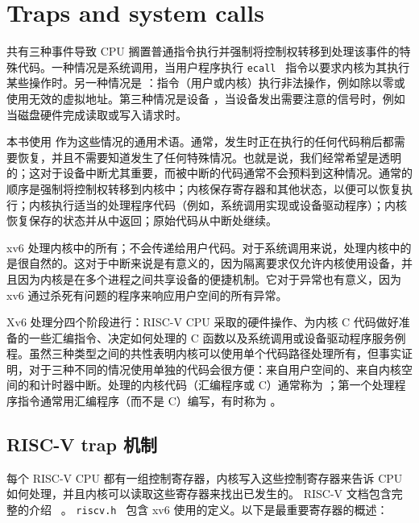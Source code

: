 

   \chapter{Traps and system calls}   
    \label{CH:TRAP}     

共有三种事件导致 CPU 搁置普通指令执行并强制将控制权转移到处理该事件的特殊代码。一种情况是系统调用，当用户程序执行  {    \tt    ecall   }  指令以要求内核为其执行某些操作时。另一种情况是        ：指令（用户或内核）执行非法操作，例如除以零或使用无效的虚拟地址。第三种情况是设备        ，当设备发出需要注意的信号时，例如当磁盘硬件完成读取或写入请求时。  

本书使用        作为这些情况的通用术语。通常，发生时正在执行的任何代码稍后都需要恢复，并且不需要知道发生了任何特殊情况。也就是说，我们经常希望是透明的；这对于设备中断尤其重要，而被中断的代码通常不会预料到这种情况。通常的顺序是强制将控制权转移到内核中；内核保存寄存器和其他状态，以便可以恢复执行；内核执行适当的处理程序代码（例如，系统调用实现或设备驱动程序）；内核恢复保存的状态并从中返回；原始代码从中断处继续。  

xv6 处理内核中的所有；不会传递给用户代码。对于系统调用来说，处理内核中的是很自然的。这对于中断来说是有意义的，因为隔离要求仅允许内核使用设备，并且因为内核是在多个进程之间共享设备的便捷机制。它对于异常也有意义，因为 xv6 通过杀死有问题的程序来响应用户空间的所有异常。  

Xv6 处理分四个阶段进行：RISC-V CPU 采取的硬件操作、为内核 C 代码做好准备的一些汇编指令、决定如何处理的 C 函数以及系统调用或设备驱动程序服务例程。虽然三种类型之间的共性表明内核可以使用单个代码路径处理所有，但事实证明，对于三种不同的情况使用单独的代码会很方便：来自用户空间的、来自内核空间的和计时器中断。处理的内核代码（汇编程序或 C）通常称为        ；第一个处理程序指令通常用汇编程序（而不是 C）编写，有时称为        。  

   \section{RISC-V trap 机制  }     

每个 RISC-V CPU 都有一组控制寄存器，内核写入这些控制寄存器来告诉 CPU 如何处理，并且内核可以读取这些寄存器来找出已发生的。 RISC-V 文档包含完整的介绍~    \cite{riscv:priv}    。  {    \tt    riscv.h   } 
        包含 xv6 使用的定义。以下是最重要寄存器的概述：  


